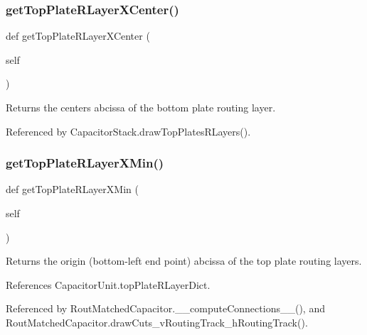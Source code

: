 \subsubsection{\texorpdfstring{get\+Top\+Plate\+R\+Layer\+X\+Center()}{getTopPlateRLayerXCenter()}}
{\footnotesize\ttfamily def get\+Top\+Plate\+R\+Layer\+X\+Center (\begin{DoxyParamCaption}\item[{}]{self }\end{DoxyParamCaption})}

\begin{DoxyReturn}{Returns}
the center\textquotesingle{}s abcissa of the bottom plate routing layer. 
\end{DoxyReturn}


Referenced by Capacitor\+Stack.\+draw\+Top\+Plates\+R\+Layers().

\mbox{\label{classpython_1_1capacitorunit_1_1CapacitorUnit_a9a2ffcdaaabfec8adb1c8a67f82eec67}} 
\subsubsection{\texorpdfstring{get\+Top\+Plate\+R\+Layer\+X\+Min()}{getTopPlateRLayerXMin()}}
{\footnotesize\ttfamily def get\+Top\+Plate\+R\+Layer\+X\+Min (\begin{DoxyParamCaption}\item[{}]{self }\end{DoxyParamCaption})}

\begin{DoxyReturn}{Returns}
the origin (bottom-\/left end point) abcissa of the top plate routing layers. 
\end{DoxyReturn}


References Capacitor\+Unit.\+top\+Plate\+R\+Layer\+Dict.



Referenced by Rout\+Matched\+Capacitor.\+\_\+\+\_\+compute\+Connections\+\_\+\+\_\+(), and Rout\+Matched\+Capacitor.\+draw\+Cuts\+\_\+v\+Routing\+Track\+\_\+h\+Routing\+Track().

\mbox{\label{classpython_1_1capacitorunit_1_1CapacitorUnit_a279a946fe3127e06435d8eadfa62ec04}} 
